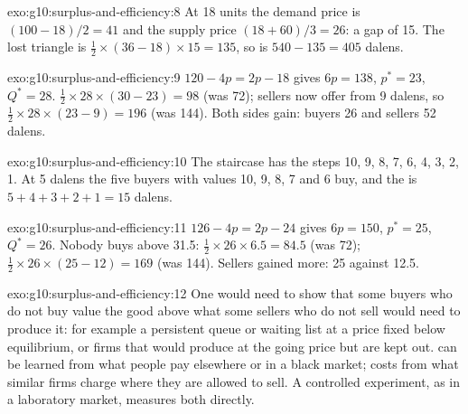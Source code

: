 \begin{solution}{exo:g10:surplus-and-efficiency:8}
At 18 units the demand price is $(100 - 18)/2 = 41$ and the supply price $(18 + 60)/3 = 26$: a gap of 15. The lost triangle is $\tfrac12 \times (36 - 18)
\times 15 = 135$, so  is $540 - 135 = 405$ dalens.
\end{solution}

\begin{solution}{exo:g10:surplus-and-efficiency:9}
$120 - 4p = 2p - 18$ gives $6p = 138$, $p^* = 23$, $Q^* = 28$.  $\tfrac12 \times 28 \times (30 - 23) = 98$ (was 72); sellers now offer from 9
dalens, so  $\tfrac12 \times 28 \times (23 - 9) = 196$ (was 144). Both sides gain: buyers 26 and sellers 52 dalens.
\end{solution}

\begin{solution}{exo:g10:surplus-and-efficiency:10}
The staircase has the steps 10, 9, 8, 7, 6, 4, 3, 2, 1. At 5 dalens the five buyers with values 10, 9, 8, 7 and 6 buy, and the  is $5 + 4 + 3
+ 2 + 1 = 15$ dalens.
\end{solution}

\begin{solution}{exo:g10:surplus-and-efficiency:11}
$126 - 4p = 2p - 24$ gives $6p = 150$, $p^* = 25$, $Q^* = 26$. Nobody buys above 31.5:  $\tfrac12 \times 26 \times 6.5 = 84.5$ (was 72);
 $\tfrac12 \times 26 \times (25 - 12) = 169$ (was 144). Sellers gained more: 25 against 12.5.
\end{solution}

\begin{solution}{exo:g10:surplus-and-efficiency:12}
One would need to show that some buyers who do not buy value the good above what some sellers who do not sell would need to produce it: for example a persistent
queue or waiting list at a price fixed below equilibrium, or firms that would produce at the going price but are kept out.  can be learned
from what people pay elsewhere or in a black market; costs from what similar firms charge where they are allowed to sell. A controlled experiment, as in a
laboratory market, measures both directly.
\end{solution}

